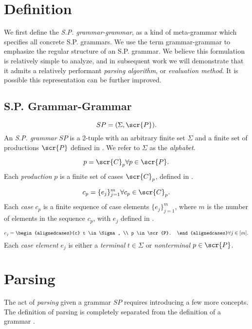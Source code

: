 \documentclass[10pt]{article}
\begin{document}
\section{Definition}
\label{sec:definition}
We first define the \textit{S.P. grammar-grammar}, as a kind of meta-grammar which specifies all concrete S.P. grammars. We use the term grammar-grammar to emphasize the regular structure of an S.P. grammar. We believe this formulation is relatively simple to analyze, and in subsequent work we will demonstrate that it admits a relatively performant \textit{parsing algorithm}, or \textit{evaluation method}. It is possible this representation can be further improved.

\subsection{S.P. Grammar-Grammar}
\label{sec:grammar-grammar}
\begin{equation}
  \label{eq:sp}
  SP = (\Sigma, \scr{P}).
\end{equation}
An \textit{S.P. grammar} $SP$ is a 2-tuple with an arbitrary finite set $\Sigma$ and a finite set of productions $\scr{P}$ defined in . We refer to $\Sigma$ as the \textit{alphabet}.

\begin{equation}
  \label{eq:p}
  p = \scr{C}_p \forall p \in \scr{P}.
\end{equation}
Each \textit{production} $p$ is a finite set of cases $\scr{C}_p$, defined in .

\begin{equation}
  \label{eq:cp}
  c_p = \{e_j\}_{j=1}^m \forall c_p \in \scr{C}_p.
\end{equation}
Each \textit{case} $c_p$ is a finite sequence of case elements $\{e_j\}_{j=1}^m$, where $m$ is the number of elements in the sequence $c_p$, with $e_j$ defined in .

\begin{equation}
  \label{eq:ej}
  e_j = \begin{alignedcases}{c}
    t \in \Sigma, \\
    p \in \scr{P}.
  \end{alignedcases} \forall j \in [m].
\end{equation}
Each \textit{case element} $e_j$ is either a \textit{terminal} $t \in \Sigma$ or \textit{nonterminal} $p \in \scr{P}$.

\section{Parsing}
\label{sec:parsing}
The act of \textit{parsing} given a grammar $SP$ requires introducing a few more concepts. The definition of parsing is completely separated from the definition of a grammar .
\end{document}
